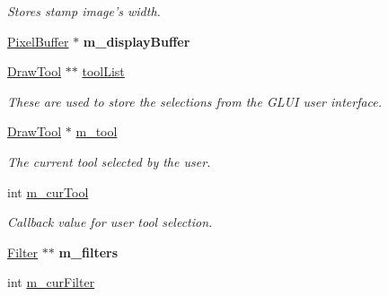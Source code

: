 \begin{DoxyCompactItemize}
{{\begin{DoxyCompactList}\small\item\em Stores stamp image's width. \end{DoxyCompactList}\item 
\hypertarget{classFlashPhotoApp_a9662e1dbd6e003a62179eecba827e910}{\hyperlink{classPixelBuffer}{Pixel\-Buffer} $\ast$ {\bfseries m\-\_\-display\-Buffer}}\label{classFlashPhotoApp_a9662e1dbd6e003a62179eecba827e910}

\item 
\hypertarget{classFlashPhotoApp_a752ba29ca132a3fd4deaa3727946f7f6}{\hyperlink{classDrawTool}{Draw\-Tool} $\ast$$\ast$ \hyperlink{classFlashPhotoApp_a752ba29ca132a3fd4deaa3727946f7f6}{tool\-List}}\label{classFlashPhotoApp_a752ba29ca132a3fd4deaa3727946f7f6}

\begin{DoxyCompactList}\small\item\em These are used to store the selections from the G\-L\-U\-I user interface. \end{DoxyCompactList}\item 
\hypertarget{classFlashPhotoApp_a69d8dcf7147882964a6d2832bbab67e2}{\hyperlink{classDrawTool}{Draw\-Tool} $\ast$ \hyperlink{classFlashPhotoApp_a69d8dcf7147882964a6d2832bbab67e2}{m\-\_\-tool}}\label{classFlashPhotoApp_a69d8dcf7147882964a6d2832bbab67e2}

\begin{DoxyCompactList}\small\item\em The current tool selected by the user. \end{DoxyCompactList}\item 
\hypertarget{classFlashPhotoApp_a4fe8a885ae7b5e698c40a7585b4e292d}{int \hyperlink{classFlashPhotoApp_a4fe8a885ae7b5e698c40a7585b4e292d}{m\-\_\-cur\-Tool}}\label{classFlashPhotoApp_a4fe8a885ae7b5e698c40a7585b4e292d}

\begin{DoxyCompactList}\small\item\em Callback value for user tool selection. \end{DoxyCompactList}\item 
\hypertarget{classFlashPhotoApp_a40ef9e2d21c3f80cee59be363e21b9bc}{\hyperlink{classFilter}{Filter} $\ast$$\ast$ {\bfseries m\-\_\-filters}}\label{classFlashPhotoApp_a40ef9e2d21c3f80cee59be363e21b9bc}

\item 
\hypertarget{classFlashPhotoApp_a584dd16d8f2aad51028759a1dd94c83f}{int \hyperlink{classFlashPhotoApp_a584dd16d8f2aad51028759a1dd94c83f}{m\-\_\-cur\-Filter}}\label{classFlashPhotoApp_a584dd16d8f2aad51028759a1dd94c83f}

}}
\end{DoxyCompactItemize}
